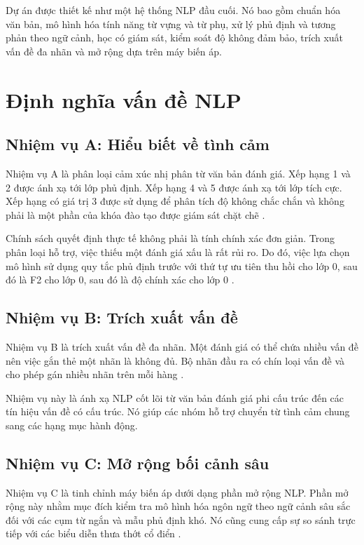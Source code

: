 \documentclass[12pt,a4paper]{article}
\begin{document}
Dự án được thiết kế như một hệ thống NLP đầu cuối. Nó bao gồm chuẩn hóa văn bản, mô hình hóa tính năng từ vựng và từ phụ, xử lý phủ định và tương phản theo ngữ cảnh, học có giám sát, kiểm soát độ không đảm bảo, trích xuất vấn đề đa nhãn và mở rộng dựa trên máy biến áp.

\section{Định nghĩa vấn đề NLP}
\subsection{Nhiệm vụ A: Hiểu biết về tình cảm}
Nhiệm vụ A là phân loại cảm xúc nhị phân từ văn bản đánh giá. Xếp hạng 1 và 2 được ánh xạ tới lớp phủ định. Xếp hạng 4 và 5 được ánh xạ tới lớp tích cực. Xếp hạng có giá trị 3 được sử dụng để phân tích độ không chắc chắn và không phải là một phần của khóa đào tạo được giám sát chặt chẽ \cite{turney2002,wang2012}.

Chính sách quyết định thực tế không phải là tính chính xác đơn giản. Trong phân loại hỗ trợ, việc thiếu một đánh giá xấu là rất rủi ro. Do đó, việc lựa chọn mô hình sử dụng quy tắc phủ định trước với thứ tự ưu tiên thu hồi cho lớp 0, sau đó là F2 cho lớp 0, sau đó là độ chính xác cho lớp 0 \cite{saito2015}.

\subsection{Nhiệm vụ B: Trích xuất vấn đề}
Nhiệm vụ B là trích xuất vấn đề đa nhãn. Một đánh giá có thể chứa nhiều vấn đề nên việc gắn thẻ một nhãn là không đủ. Bộ nhãn đầu ra có chín loại vấn đề và cho phép gán nhiều nhãn trên mỗi hàng \cite{zhang2014,tsoumakas2011}.

Nhiệm vụ này là ánh xạ NLP cốt lõi từ văn bản đánh giá phi cấu trúc đến các tín hiệu vấn đề có cấu trúc. Nó giúp các nhóm hỗ trợ chuyển từ tình cảm chung sang các hạng mục hành động.

\subsection{Nhiệm vụ C: Mở rộng bối cảnh sâu}
Nhiệm vụ C là tinh chỉnh máy biến áp dưới dạng phần mở rộng NLP. Phần mở rộng này nhằm mục đích kiểm tra mô hình hóa ngôn ngữ theo ngữ cảnh sâu sắc đối với các cụm từ ngắn và mẫu phủ định khó. Nó cũng cung cấp sự so sánh trực tiếp với các biểu diễn thưa thớt cổ điển \cite{vaswani2017,devlin2019}.
\end{document}
